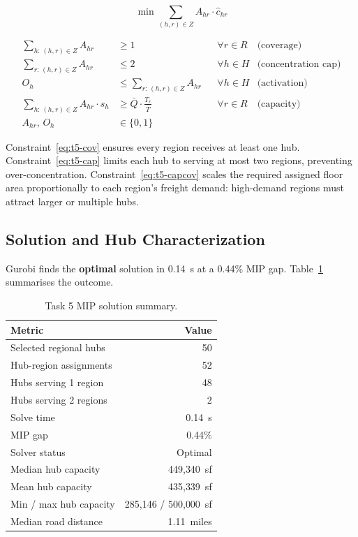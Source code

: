 \begin{equation}
  \min \sum_{(h,r) \in Z} A_{hr} \cdot \hat{c}_{hr}
  \label{eq:task5-obj}
\end{equation}

\begin{align}
  \sum_{h:\,(h,r)\in Z} A_{hr} &\geq 1
    && \forall r \in R
    & \text{(coverage)} \label{eq:t5-cov} \\[4pt]
  \sum_{r:\,(h,r)\in Z} A_{hr} &\leq 2
    && \forall h \in H
    & \text{(concentration cap)} \label{eq:t5-cap} \\[4pt]
  O_h &\leq \sum_{r:\,(h,r)\in Z} A_{hr}
    && \forall h \in H
    & \text{(activation)} \label{eq:t5-act} \\[4pt]
  \sum_{h:\,(h,r)\in Z} A_{hr} \cdot s_h &\geq \bar{Q} \cdot \frac{T_r}{\bar{T}}
    && \forall r \in R
    & \text{(capacity)} \label{eq:t5-capcov} \\[4pt]
  A_{hr},\, O_h &\in \{0,1\}
    &&& \label{eq:t5-bin}
\end{align}

Constraint~\eqref{eq:t5-cov} ensures every region receives at least one hub.
Constraint~\eqref{eq:t5-cap} limits each hub to serving at most two regions,
preventing over-concentration. Constraint~\eqref{eq:t5-capcov} scales the required
assigned floor area proportionally to each region's freight demand: high-demand regions
must attract larger or multiple hubs.

\subsection{Solution and Hub Characterization}

Gurobi finds the \textbf{optimal} solution in 0.14~s at a 0.44\% MIP gap.
Table~\ref{tab:task5-results} summarises the outcome.

\begin{table}[H]
  \centering
  \caption{Task 5 MIP solution summary.}
  \label{tab:task5-results}
  \begin{tabular}{lr}
    \toprule
    Metric & Value \\
    \midrule
    Selected regional hubs & 50 \\
    Hub-region assignments & 52 \\
    Hubs serving 1 region & 48 \\
    Hubs serving 2 regions & 2 \\
    Solve time & 0.14~s \\
    MIP gap & 0.44\% \\
    Solver status & Optimal \\
    \midrule
    Median hub capacity & 449{,}340~sf \\
    Mean hub capacity & 435{,}339~sf \\
    Min / max hub capacity & 285{,}146 / 500{,}000~sf \\
    Median road distance & 1.11~miles \\
    \bottomrule
  \end{tabular}
\end{table}

